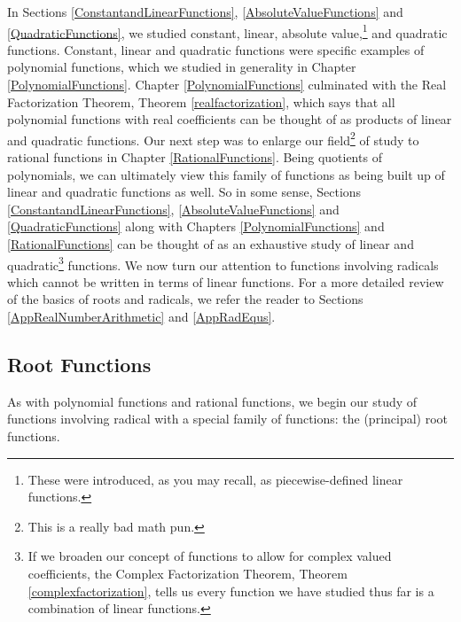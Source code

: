\documentclass{ximera}
\begin{document}
	\author{Stitz-Zeager}




\setcounter{footnote}{0}

\label{RootRadicalFunctions}

In Sections \ref{ConstantandLinearFunctions}, \ref{AbsoluteValueFunctions} and \ref{QuadraticFunctions}, we studied constant, linear,  absolute value,\footnote{These were introduced, as you may recall, as piecewise-defined linear functions.} and quadratic functions.  Constant, linear and quadratic functions were specific examples of polynomial functions, which we studied in generality in Chapter \ref{PolynomialFunctions}. Chapter \ref{PolynomialFunctions} culminated with the Real Factorization Theorem, Theorem \ref{realfactorization}, which says that all polynomial functions with real coefficients can be thought of as products of linear and quadratic functions.  Our next step was to enlarge our field\footnote{This is a really bad math pun.} of study to rational functions in Chapter \ref{RationalFunctions}.  Being quotients of polynomials, we can ultimately view this family of functions as being built up of linear and quadratic functions as well.  So in some sense, Sections   \ref{ConstantandLinearFunctions}, \ref{AbsoluteValueFunctions} and \ref{QuadraticFunctions} along with Chapters \ref{PolynomialFunctions} and \ref{RationalFunctions} can be thought of as an exhaustive study of linear and quadratic\footnote{If we broaden our concept of functions to allow for complex valued coefficients, the Complex Factorization Theorem, Theorem \ref{complexfactorization}, tells us every function we have studied thus far is a combination of linear functions.} functions.  We now turn our attention to functions involving radicals which cannot be written in terms of linear functions.  For a more detailed review of the basics of roots and radicals, we refer the reader to Sections \ref{AppRealNumberArithmetic} and  \ref{AppRadEqus}.  




\subsection{Root Functions}
\label{RootFunctions}

As with polynomial functions and rational functions, we begin our study of functions involving radical with a special family of functions: the (principal) root functions.
\end{document}
